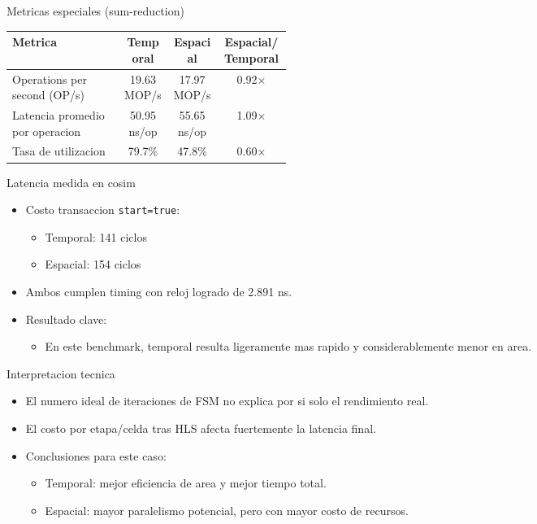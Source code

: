 \documentclass[aspectratio=169]{beamer}
\begin{document}
\begin{frame}{Metricas especiales (sum-reduction)}
\begin{table}[htbp]
\centering
\scriptsize
\begin{adjustbox}{max width=\linewidth}
\begin{tabular}{@{}p{0.40\linewidth}ccc@{}}
\toprule
\textbf{Metrica} & \textbf{Temporal} & \textbf{Espacial} & \textbf{Espacial/Temporal} \\
\midrule
Operations per second (OP/s) & 19.63 MOP/s & 17.97 MOP/s & 0.92$\times$ \\
Latencia promedio por operacion & 50.95 ns/op & 55.65 ns/op & 1.09$\times$ \\
Tasa de utilizacion & 79.7\% & 47.8\% & 0.60$\times$ \\
\bottomrule
\end{tabular}
\end{adjustbox}
\end{table}
\end{frame}

\begin{frame}{Latencia medida en cosim}
\begin{itemize}
  \item Costo transaccion \texttt{start=true}:
  \begin{itemize}
    \item Temporal: 141 ciclos
    \item Espacial: 154 ciclos
  \end{itemize}
  \item Ambos cumplen timing con reloj logrado de 2.891 ns.
  \item Resultado clave:
  \begin{itemize}
    \item En este benchmark, temporal resulta ligeramente mas rapido y considerablemente menor en area.
  \end{itemize}
\end{itemize}
\end{frame}

\begin{frame}{Interpretacion tecnica}
\begin{itemize}
  \item El numero ideal de iteraciones de FSM no explica por si solo el rendimiento real.
  \item El costo por etapa/celda tras HLS afecta fuertemente la latencia final.
  \item Conclusiones para este caso:
  \begin{itemize}
    \item Temporal: mejor eficiencia de area y mejor tiempo total.
    \item Espacial: mayor paralelismo potencial, pero con mayor costo de recursos.
  \end{itemize}
\end{itemize}
\end{frame}
\end{document}
